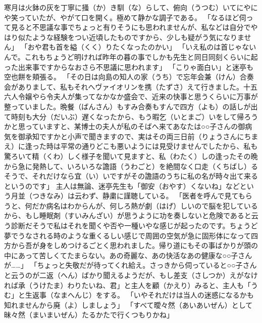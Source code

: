 \documentclass{book}
\begin{document}
寒月は火鉢の灰を丁寧に掻（か）き馴（な）らして、俯向（うつむ）いてにやにや笑っていたが、やがて口を開く。極めて静かな調子である。
「なるほど伺って見ると不思議な事でちょっと有りそうにも思われませんが、私などは自分でやはり似たような経験をつい近頃したものですから、少しも疑がう気になりません」
「おや君も首を縊（くく）りたくなったのかい」
「いえ私のは首じゃないんで。これもちょうど明ければ昨年の暮の事でしかも先生と同日同刻くらいに起った出来事ですからなおさら不思議に思われます」
「こりゃ面白い」と迷亭も空也餅を頬張る。
「その日は向島の知人の家（うち）で忘年会兼（けん）合奏会がありまして、私もそれへヴァイオリンを携（たずさ）えて行きました。十五六人令嬢やら令夫人が集ってなかなか盛会で、近来の快事と思うくらいに万事が整っていました。晩餐（ばんさん）もすみ合奏もすんで四方（よも）の話しが出て時刻も大分（だいぶ）遅くなったから、もう暇乞（いとまご）いをして帰ろうかと思っていますと、某博士の夫人が私のそばへ来てあなたは○○子さんの御病気を御承知ですかと小声で聞きますので、実はその両三日前（りょうさんにちまえ）に逢った時は平常の通りどこも悪いようには見受けませんでしたから、私も驚ろいて精（くわ）しく様子を聞いて見ますと、私（わたく）しの逢ったその晩から急に発熱して、いろいろな譫語（うわごと）を絶間なく口走（くちばし）るそうで、それだけなら宜（い）いですがその譫語のうちに私の名が時々出て来るというのです」
主人は無論、迷亭先生も「御安（おやす）くないね」などという月並（つきなみ）は云わず、静粛に謹聴している。
「医者を呼んで見てもらうと、何だか病名はわからんが、何しろ熱が劇（はげ）しいので脳を犯しているから、もし睡眠剤（すいみんざい）が思うように功を奏しないと危険であると云う診断だそうで私はそれを聞くや否や一種いやな感じが起ったのです。ちょうど夢でうなされる時のような重くるしい感じで周囲の空気が急に固形体になって四方から吾が身をしめつけるごとく思われました。帰り道にもその事ばかりが頭の中にあって苦しくてたまらない。あの奇麗な、あの快活なあの健康な○○子さんが\ldots{}\ldots{}」
「ちょっと失敬だが待ってくれ給え。さっきから伺っていると○○子さんと云うのが二返（へん）ばかり聞えるようだが、もし差支（さしつか）えがなければ承（うけたま）わりたいね、君」と主人を顧（かえり）みると、主人も「うむ」と生返事（なまへんじ）をする。
「いやそれだけは当人の迷惑になるかも知れませんから廃（よ）しましょう」
「すべて曖々然（あいあいぜん）として昧々然（まいまいぜん）たるかたで行くつもりかね」
\end{document}
